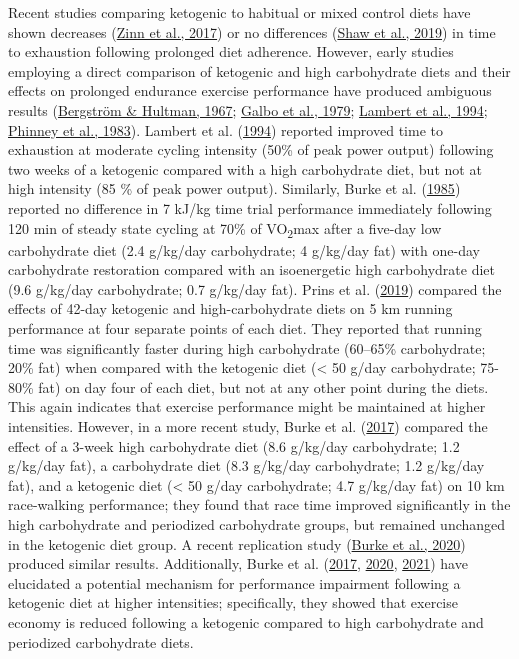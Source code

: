 \documentclass[]{cik}%
\begin{document}
Recent studies comparing ketogenic to habitual or mixed control diets
have shown decreases (\protect\hyperlink{ref-25}{Zinn et al., 2017}) or
no differences (\protect\hyperlink{ref-26}{Shaw et al., 2019}) in time
to exhaustion following prolonged diet adherence. However, early studies
employing a direct comparison of ketogenic and high carbohydrate diets
and their effects on prolonged endurance exercise performance have
produced ambiguous results (\protect\hyperlink{ref-27}{Bergström \&
Hultman, 1967}; \protect\hyperlink{ref-12}{Galbo et al., 1979};
\protect\hyperlink{ref-7}{Lambert et al., 1994};
\protect\hyperlink{ref-28}{Phinney et al., 1983}). Lambert et al.
(\protect\hyperlink{ref-7}{1994}) reported improved time to exhaustion
at moderate cycling intensity (50\% of peak power output) following two
weeks of a ketogenic compared with a high carbohydrate diet, but not at
high intensity (85 \% of peak power output). Similarly, Burke et al.
(\protect\hyperlink{ref-18}{1985}) reported no difference in 7 kJ/kg
time trial performance immediately following 120 min of steady state
cycling at 70\% of VO\textsubscript{2}max after a five-day low
carbohydrate diet (2.4 g/kg/day carbohydrate; 4 g/kg/day fat) with
one-day carbohydrate restoration compared with an isoenergetic high
carbohydrate diet (9.6 g/kg/day carbohydrate; 0.7 g/kg/day fat). Prins
et al. (\protect\hyperlink{ref-23}{2019}) compared the effects of 42-day
ketogenic and high-carbohydrate diets on 5 km running performance at
four separate points of each diet. They reported that running time was
significantly faster during high carbohydrate (60--65\% carbohydrate;
20\% fat) when compared with the ketogenic diet (\textless{} 50 g/day
carbohydrate; 75-80\% fat) on day four of each diet, but not at any
other point during the diets. This again indicates that exercise
performance might be maintained at higher intensities. However, in a
more recent study, Burke et al. (\protect\hyperlink{ref-19}{2017})
compared the effect of a 3-week high carbohydrate diet (8.6 g/kg/day
carbohydrate; 1.2 g/kg/day fat), a carbohydrate diet (8.3 g/kg/day
carbohydrate; 1.2 g/kg/day fat), and a ketogenic diet (\textless{} 50
g/day carbohydrate; 4.7 g/kg/day fat) on 10 km race-walking performance;
they found that race time improved significantly in the high
carbohydrate and periodized carbohydrate groups, but remained unchanged
in the ketogenic diet group. A recent replication study
(\protect\hyperlink{ref-20}{Burke et al., 2020}) produced similar
results. Additionally, Burke et al. (\protect\hyperlink{ref-19}{2017},
\protect\hyperlink{ref-20}{2020}, \protect\hyperlink{ref-16}{2021}) have
elucidated a potential mechanism for performance impairment following a
ketogenic diet at higher intensities; specifically, they showed that
exercise economy is reduced following a ketogenic compared to high
carbohydrate and periodized carbohydrate diets.
\end{document}
